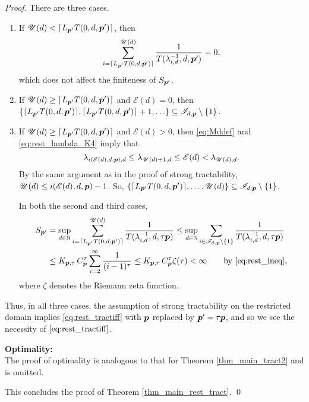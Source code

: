 \documentclass[sort&compress]{elsarticle}
\newcommand{\theM}{\mathscr{E}}
\newcommand{\theUB}{\mathscr{U}}
\begin{document}
\begin{proof}
There are three cases.
\begin{enumerate}
\renewcommand{\labelenumi}{\roman{enumi})}


\item If $\theUB(d) <\lceil L_{\vp'} T(0,d,\vp')\rceil$, then
\[
\sum_{i = \lceil L_{\vp'} T(0,d,\vp')\rceil }^{\theUB(d)} \frac{1}{T (\lambda_{i,d}^{-1},d, \vp')} = 0,
\]
which does not affect the finiteness of $S_{\boldsymbol{p}'}$.

\item If $\theUB(d) \ge \lceil L_{\vp'} T(0,d,\vp')\rceil$ and $\theM(d) = 0$, then $\{\lceil L_{\boldsymbol{p}'} T(0,d,\boldsymbol{p}')\rceil,  \lceil L_{\boldsymbol{p}'} T(0,d,\boldsymbol{p}')\rceil + 1, \ldots \} \subseteq \mathscr{I}_{d,\boldsymbol{p}} \setminus \{1\}$.

\item If $\theUB(d) \ge \lceil L_{\vp'} T(0,d,\vp')\rceil$ and $\theM(d) >0$, then \eqref{eq:Mddef} and \eqref{eq:rest_lambda_K4} imply that
\[
\lambda_{i(\theM(d),d,\vp),d} \le \lambda_{\theUB(d)+1,d} \le \theM(d) < \lambda_{\theUB(d),d}.
\]
By the same argument as in the proof of strong tractability, $\theUB(d) \le i(\theM(d),d,\vp)-1$.  So, $\{ \lceil L_{\vp'} T(0,d,\vp')\rceil, \ldots, \theUB(d)\} \subseteq \mathscr{I}_{d,\vp} \setminus \{1\}$.

\bigskip

In both the second and third cases,
\begin{align*}
S_{\vp'} & = \sup_{d\in\naturals} \sum_{i =  \lceil L_{\vp'} T(0,d,\vp')\rceil}^{\theUB(d)} \frac{1}{T (\lambda_{i,d}^{-1},d, \tau \vp)}
\le
\sup_{d\in\naturals} \sum_{i \in \mathscr{I}_{d,\vp} \setminus\{1\} } \frac{1}{T (\lambda_{i,d}^{-1},d, \tau \vp)} \\
&  \le  K_{\vp,\tau}\, C_{\vp}^\tau
\sum_{i=2}^\infty \frac{1}{(i-1)^\tau}
 \le K_{\vp,\tau}\, C_{\vp}^\tau
\zeta (\tau)
 < \infty \qquad \text{by \eqref{eq:rest_ineq}},
\end{align*}
where $\zeta$ denotes the Riemann zeta function.

\end{enumerate}
Thus, in all three cases, the assumption of strong tractability on the restricted domain implies \eqref{eq:rest_tractiff} with $\boldsymbol{p}$ replaced by $\boldsymbol{p}' = \tau \boldsymbol{p}$, and so we see the necessity of $\eqref{eq:rest_tractiff}$.
\bigskip


\bigskip

\noindent \textbf{Optimality:} \\
The proof of optimality is analogous to that for Theorem \ref{thm_main_tract2} and is omitted.

\bigskip

\noindent
This concludes the proof of Theorem \ref{thm_main_rest_tract}.  \qed
\end{proof}
\end{document}
